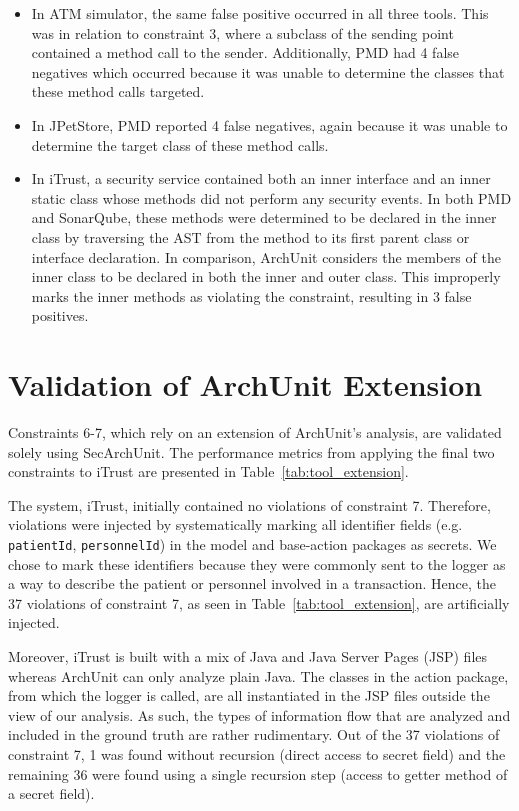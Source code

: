 \begin{itemize}
    \item In ATM simulator, the same false positive occurred in all three tools. This was in relation to constraint 3, where a subclass of the sending point contained a method call to the sender. Additionally, PMD had 4 false negatives which occurred because it was unable to determine the classes that these method calls targeted.
    \item In JPetStore, PMD reported 4 false negatives, again because it was unable to determine the target class of these method calls.
    \item In iTrust, a security service contained both an inner interface and an inner static class whose methods did not perform any security events. In both PMD and SonarQube, these methods were determined to be declared in the inner class by traversing the AST from the method to its first parent class or interface declaration. In comparison, ArchUnit considers the members of the inner class to be declared in both the inner and outer class. This improperly marks the inner methods as violating the constraint, resulting in 3 false positives.
\end{itemize}



\section{Validation of ArchUnit Extension}
Constraints 6-7, which rely on an extension of ArchUnit's analysis, are validated solely using SecArchUnit. The performance metrics from applying the final two constraints to iTrust are presented in Table~\ref{tab:tool_extension}.

The system, iTrust, initially contained no violations of constraint 7. Therefore, violations were injected by systematically marking all identifier fields (e.g. \texttt{patientId}, \texttt{personnelId}) in the model and base-action packages as secrets. We chose to mark these identifiers because they were commonly sent to the logger as a way to describe the patient or personnel involved in a transaction. Hence, the 37 violations of constraint 7, as seen in Table~\ref{tab:tool_extension}, are artificially injected.

Moreover, iTrust is built with a mix of Java and Java Server Pages (JSP) files whereas ArchUnit can only analyze plain Java. The classes in the action package, from which the logger is called, are all instantiated in the JSP files outside the view of our analysis. As such, the types of information flow that are analyzed and included in the ground truth are rather rudimentary. Out of the 37 violations of constraint 7, 1 was found without recursion (direct access to secret field) and the remaining 36 were found using a single recursion step (access to getter method of a secret field).

